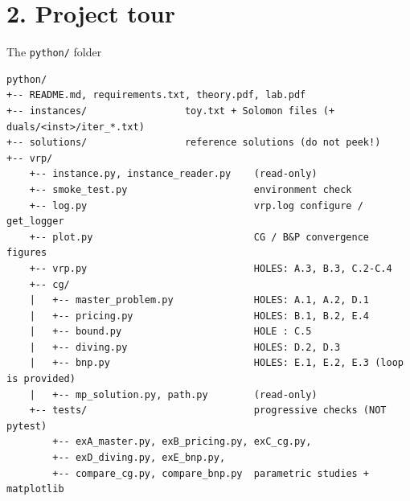 \documentclass[10pt,aspectratio=169]{beamer}
\begin{document}
\section{2. Project tour}

\begin{frame}[fragile]{The \texttt{python/} folder}
\begin{lstlisting}[style=sh,basicstyle=\ttfamily\tiny]
python/
+-- README.md, requirements.txt, theory.pdf, lab.pdf
+-- instances/                 toy.txt + Solomon files (+ duals/<inst>/iter_*.txt)
+-- solutions/                 reference solutions (do not peek!)
+-- vrp/
    +-- instance.py, instance_reader.py    (read-only)
    +-- smoke_test.py                      environment check
    +-- log.py                             vrp.log configure / get_logger
    +-- plot.py                            CG / B&P convergence figures
    +-- vrp.py                             HOLES: A.3, B.3, C.2-C.4
    +-- cg/
    |   +-- master_problem.py              HOLES: A.1, A.2, D.1
    |   +-- pricing.py                     HOLES: B.1, B.2, E.4
    |   +-- bound.py                       HOLE : C.5
    |   +-- diving.py                      HOLES: D.2, D.3
    |   +-- bnp.py                         HOLES: E.1, E.2, E.3 (loop is provided)
    |   +-- mp_solution.py, path.py        (read-only)
    +-- tests/                             progressive checks (NOT pytest)
        +-- exA_master.py, exB_pricing.py, exC_cg.py,
        +-- exD_diving.py, exE_bnp.py,
        +-- compare_cg.py, compare_bnp.py  parametric studies + matplotlib
\end{lstlisting}
\end{frame}
\end{document}
